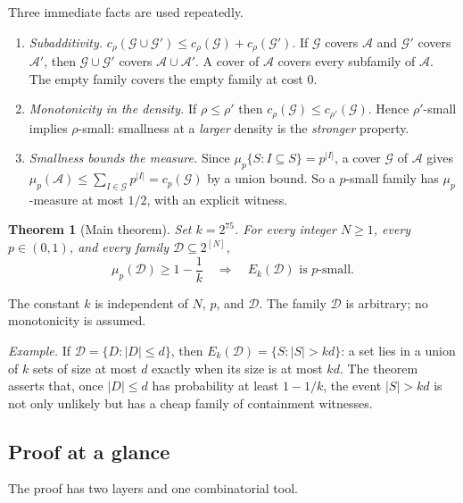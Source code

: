 \documentclass[11pt,letterpaper]{article}
\newtheorem{theorem}{Theorem}[section]
\theoremstyle{definition}
\theoremstyle{remark}
\numberwithin{equation}{section}
\begin{document}
Three immediate facts are used repeatedly.
\begin{enumerate}[label=(O\arabic*)]
\item\label{O:sub} \emph{Subadditivity.}
$c_\rho(\mathcal G\cup\mathcal G')\le c_\rho(\mathcal G)+c_\rho(\mathcal G')$.
If $\mathcal G$ covers $\mathcal A$ and $\mathcal G'$ covers $\mathcal A'$,
then $\mathcal G\cup\mathcal G'$ covers $\mathcal A\cup\mathcal A'$. A cover
of $\mathcal A$ covers every subfamily of $\mathcal A$. The empty family
covers the empty family at cost $0$.
\item\label{O:mono} \emph{Monotonicity in the density.} If
$\rho\le\rho'$ then $c_\rho(\mathcal G)\le c_{\rho'}(\mathcal G)$. Hence
$\rho'$-small implies $\rho$-small: smallness at a \emph{larger} density is
the \emph{stronger} property.
\item\label{O:union} \emph{Smallness bounds the measure.} Since
$\mu_p\{S:I\subseteq S\}=p^{|I|}$, a cover $\mathcal G$ of $\mathcal A$
gives $\mu_p(\mathcal A)\le\sum_{I\in\mathcal G}p^{|I|}=c_p(\mathcal G)$
by a union bound. So a $p$-small family has $\mu_p$-measure at most $1/2$,
with an explicit witness.
\end{enumerate}

\begin{theorem}[Main theorem]
\label{thm:main}
Set $k=2^{75}$. For every integer $N\ge1$, every $p\in(0,1)$, and every
family $\mathcal D\subseteq2^{[N]}$,
\[
\mu_p(\mathcal D)\ge1-\frac1k
\quad\Longrightarrow\quad
E_k(\mathcal D)\text{ is }p\text{-small}.
\]
\end{theorem}

The constant $k$ is independent of $N$, $p$, and $\mathcal D$. The family
$\mathcal D$ is arbitrary; no monotonicity is assumed.

\emph{Example.} If $\mathcal D=\{D:|D|\le d\}$, then
$E_k(\mathcal D)=\{S:|S|>kd\}$: a set lies in a union of $k$ sets of size at
most $d$ exactly when its size is at most $kd$. The theorem asserts that,
once $|D|\le d$ has probability at least $1-1/k$, the event $|S|>kd$ is not
only unlikely but has a cheap family of containment witnesses.

\subsection{Proof at a glance}
\label{sec:glance}

The proof has two layers and one combinatorial tool.
\end{document}
